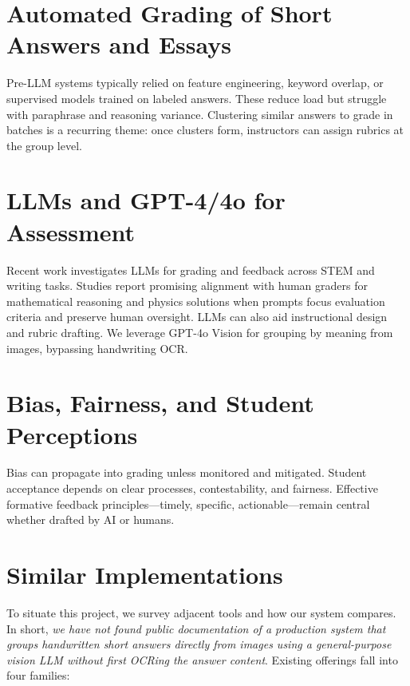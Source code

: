 \documentclass[ms,twoside,print]{nuthesis}
\begin{document}
\section{Automated Grading of Short Answers and Essays}
Pre-LLM systems typically relied on feature engineering, keyword overlap, or supervised models trained on labeled answers. These reduce load but struggle with paraphrase and reasoning variance\cite{Weegar2022,Konnecke2020}. Clustering similar answers to grade in batches is a recurring theme: once clusters form, instructors can assign rubrics at the group level.

\section{LLMs and GPT-4/4o for Assessment}
Recent work investigates LLMs for grading and feedback across STEM and writing tasks. Studies report promising alignment with human graders for mathematical reasoning and physics solutions when prompts focus evaluation criteria and preserve human oversight\cite{Liu2023,Kortemeyer2023,Kortemeyer2023b}. LLMs can also aid instructional design and rubric drafting\cite{Lund2023}. We leverage GPT-4o Vision for grouping by meaning from images, bypassing handwriting OCR.

\section{Bias, Fairness, and Student Perceptions}
Bias can propagate into grading unless monitored and mitigated\cite{Mehrabi2021}. Student acceptance depends on clear processes, contestability, and fairness\cite{Tossell2023}. Effective formative feedback principles—timely, specific, actionable—remain central whether drafted by AI or humans\cite{Nicol2006}.

\section{Similar Implementations}
To situate this project, we survey adjacent tools and how our system compares. In short,
\emph{we have not found public documentation of a production system that groups handwritten
short answers directly from images using a general-purpose vision LLM without first OCRing the
answer content}. Existing offerings fall into four families:
\end{document}
